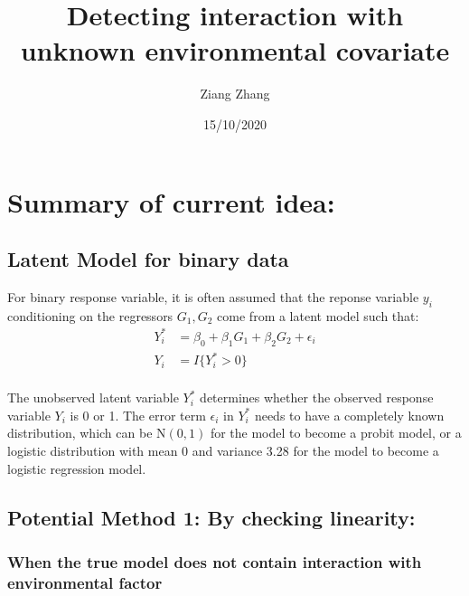 \documentclass[]{article}
\title{Detecting interaction with unknown environmental covariate}
\author{Ziang Zhang}
\date{15/10/2020}
\begin{document}
\maketitle

\hypertarget{summary-of-current-idea}{%
\section{Summary of current idea:}\label{summary-of-current-idea}}

\hypertarget{latent-model-for-binary-data}{%
\subsection{Latent Model for binary
data}\label{latent-model-for-binary-data}}

For binary response variable, it is often assumed that the reponse
variable \(y_i\) conditioning on the regressors \(G_1,G_2\) come from a
latent model such that: \begin{equation}\label{eqn:latentformulation}
\begin{aligned}
Y_i^* &= \beta_0 + \beta_1 G_1 + \beta_2 G_2 + \epsilon_i \\
Y_i &= I\{Y_i^*>0\} \\
\end{aligned}
\end{equation}

The unobserved latent variable \(Y_i^*\) determines whether the observed
response variable \(Y_i\) is 0 or 1. The error term \(\epsilon_i\) in
\(Y_i^*\) needs to have a completely known distribution, which can be
\(\text{N}(0,1)\) for the model to become a probit model, or a logistic
distribution with mean 0 and variance 3.28 for the model to become a
logistic regression model.

\hypertarget{potential-method-1-by-checking-linearity}{%
\subsection{Potential Method 1: By checking
linearity:}\label{potential-method-1-by-checking-linearity}}

\hypertarget{when-the-true-model-does-not-contain-interaction-with-environmental-factor}{%
\subsubsection{When the true model does not contain interaction with
environmental
factor}\label{when-the-true-model-does-not-contain-interaction-with-environmental-factor}}
\end{document}
